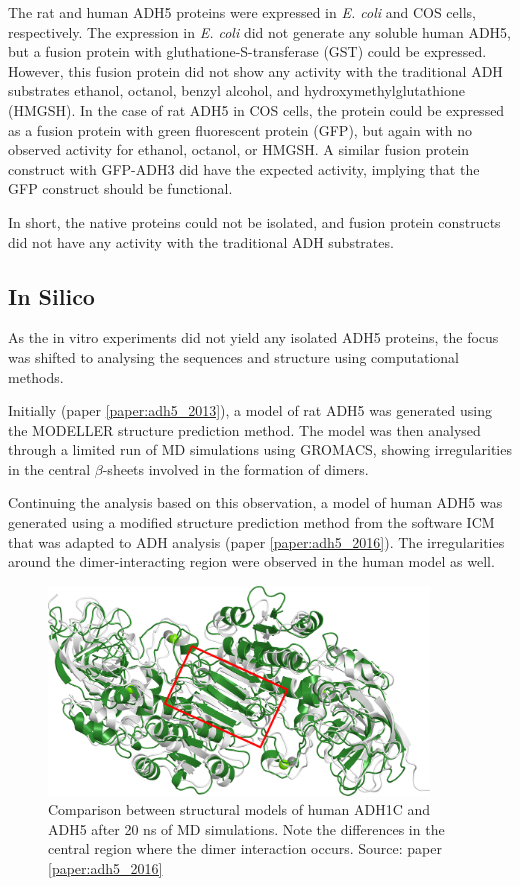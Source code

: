 \documentclass[a4paper, twoside, 12pt, openright]{report}
\begin{document}
The rat and human ADH5 proteins were expressed in {\em E. coli} and COS cells, respectively. The expression in {\em E. coli} did not generate any soluble human ADH5, but a fusion protein with gluthatione-S-transferase (GST)  could be expressed. However, this fusion protein did not show any activity with the traditional ADH substrates ethanol, octanol, benzyl alcohol, and hydroxymethylglutathione (HMGSH).  In the case of rat ADH5 in COS cells, the protein could be expressed as a fusion protein with green fluorescent protein (GFP),  but again with no observed activity for ethanol, octanol, or HMGSH. A similar fusion protein construct with GFP-ADH3 did have the expected activity, implying that the GFP construct should be functional.

In short, the native proteins could not be isolated, and fusion protein constructs did not have any activity with the traditional ADH substrates.


\subsection{In Silico}
\label{sec:adh5_silico}

As the in vitro experiments did not yield any isolated ADH5 proteins, the focus was shifted to analysing the sequences and structure using computational methods.

Initially (paper \ref{paper:adh5_2013}), a model of rat ADH5 was generated using the MODELLER structure prediction method. The model was then analysed through a limited run of MD simulations using GROMACS, showing irregularities in the central $\beta$-sheets involved in the formation of dimers.

Continuing the analysis based on this observation, a model of human ADH5 was generated using a modified structure prediction method from the software ICM that was adapted to ADH analysis (paper \ref{paper:adh5_2016}). The irregularities around the dimer-interacting region were observed in the human model as well.

\begin{figure}[p]
 \includegraphics[width=0.9\textwidth]{fig/adh5_adh1_struct.png}
 \caption{Comparison between structural models of human ADH1C and ADH5 after 20 ns of MD simulations. Note the differences in the central region where the dimer interaction occurs. Source: paper \ref{paper:adh5_2016}}
 \label{fig:adh1c_5_model_comp}
\end{figure}
\end{document}
